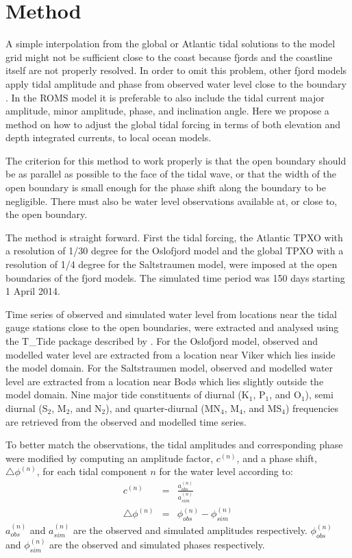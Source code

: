 \section{Method}

A simple interpolation from the global or Atlantic tidal solutions to the model grid might not be sufficient close to the coast because fjords and the coastline itself are not properly resolved. In order to omit this problem, other fjord models apply tidal amplitude and phase from observed water level close to the boundary \cite[i.e.]{foreman90,svendsen96,lynge13}. In the ROMS model it is preferable to also include the tidal current major amplitude, minor amplitude, phase, and inclination angle. Here we propose a method on how to adjust the global tidal forcing in terms of both elevation and depth integrated currents, to local ocean models. 

The criterion for this method to work properly is that the open boundary should be as parallel as possible to the face of the tidal wave, or that the width of the open boundary is small enough for the phase shift along the boundary to be negligible. There must also be water level observations available at, or close to, the open boundary.

The method is straight forward. First the tidal forcing, the Atlantic TPXO with a resolution of 1/30 degree for the Oslofjord model and the global TPXO with a resolution of 1/4 degree for the Saltstraumen model, were imposed at the open boundaries of the fjord models. The simulated time period was 150 days starting 1 April 2014. 

Time series of observed and simulated water level from locations near the tidal gauge stations close to the open boundaries, were extracted and analysed using the T\_Tide package described by \cite{pawlowicz02}. For the Oslofjord model, observed and modelled water level are extracted from a location near Viker which lies inside the model domain. For the Saltstraumen model, observed and modelled water level are extracted from a location near Bod{\o} which lies slightly outside the model domain. Nine major tide constituents of diurnal (K$_1$, P$_1$, and O$_1$), semi diurnal (S$_2$, M$_2$, and N$_2$), and quarter-diurnal (MN$_4$, M$_4$, and MS$_4$) frequencies are retrieved from the observed and modelled time series. 

To better match the observations, the tidal amplitudes and corresponding phase were modified by computing an amplitude factor, $c^{(n)}$, and a phase shift, $\triangle \phi^{(n)}$, for each tidal component $n$ for the water level according to:
\begin{eqnarray}
c^{(n)} &=& \frac{a^{(n)}_{obs}}{a^{(n)}_{sim}} \\
\triangle \phi^{(n)} &=& \phi^{(n)}_{obs} - \phi^{(n)}_{sim}
\end{eqnarray}
$a^{(n)}_{obs}$ and $a^{(n)}_{sim}$ are the observed and simulated amplitudes respectively. $\phi^{(n)}_{obs}$ and $\phi^{(n)}_{sim}$ are the observed and simulated phases respectively. 

